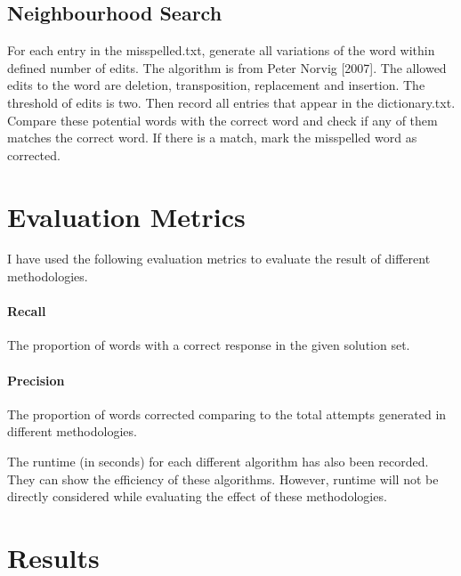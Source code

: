 \documentclass[11pt]{article}
\begin{document}
  \subsection{Neighbourhood Search}
  For each entry in the misspelled.txt, generate all variations of the word
  within defined number of edits. The algorithm is from Peter Norvig [2007].
  The allowed edits to the word are deletion, transposition, replacement and insertion.
  The threshold of edits is two. Then record all entries that
  appear in the dictionary.txt. Compare these potential words with the correct word
  and check if any of them matches the correct word. If there is a match, mark
  the misspelled word as corrected.

\section{Evaluation Metrics}
I have used the following evaluation metrics to evaluate the result of different
methodologies.

  \paragraph{Recall} The proportion of words with a correct response in the given
  solution set.

  \paragraph{Precision} The proportion of words corrected comparing
  to the total attempts generated in different methodologies.

  The runtime (in seconds) for each different algorithm has also been recorded.
  They can show the efficiency of these algorithms. However, runtime will not be
  directly considered while evaluating the effect of these methodologies.

\section{Results}
\end{document}
